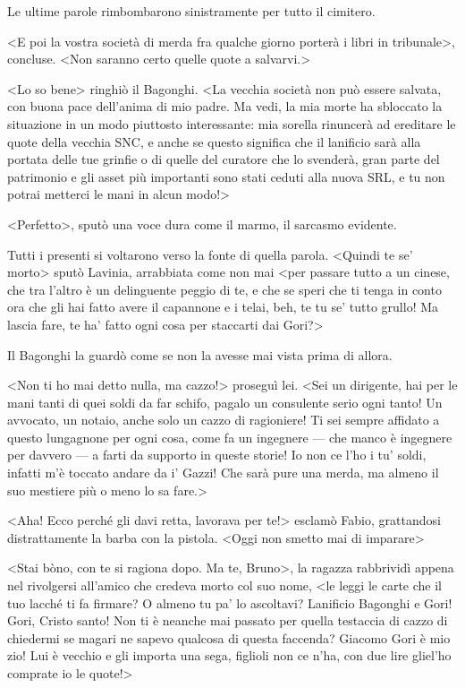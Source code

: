 Le ultime parole rimbombarono sinistramente per tutto il cimitero.

<E poi la vostra società di merda fra qualche giorno porterà i libri in tribunale>, concluse. <Non saranno certo quelle quote a salvarvi.>

<Lo so bene> ringhiò il Bagonghi. <La vecchia società non può essere salvata, con buona pace dell'anima di mio padre. Ma vedi, la mia morte ha sbloccato la situazione in un modo piuttosto interessante: mia sorella rinuncerà ad ereditare le quote della vecchia SNC, e anche se questo significa che il lanificio sarà alla portata delle tue grinfie o di quelle del curatore che lo svenderà, gran parte del patrimonio e gli asset più importanti sono stati ceduti alla nuova SRL, e tu non potrai metterci le mani in alcun modo!>

<Perfetto>, sputò una voce dura come il marmo, il sarcasmo evidente.

Tutti i presenti si voltarono verso la fonte di quella parola. <Quindi te se' morto> sputò Lavinia, arrabbiata come non mai <per passare tutto a un cinese, che tra l'altro è un delinguente peggio di te, e che se speri che ti tenga in conto ora che gli hai fatto avere il capannone e i telai, beh, te tu se' tutto grullo! Ma lascia fare, te ha' fatto ogni cosa per staccarti dai Gori?>

Il Bagonghi la guardò come se non la avesse mai vista prima di allora.

<Non ti ho mai detto nulla, ma cazzo!> proseguì lei. <Sei un dirigente, hai per le mani tanti di quei soldi da far schifo, pagalo un consulente serio ogni tanto! Un avvocato, un notaio, anche solo un cazzo di ragioniere! Ti sei sempre affidato a questo lungagnone per ogni cosa, come fa un ingegnere --- che manco è ingegnere per davvero --- a farti da supporto in queste storie! Io non ce l'ho i tu' soldi, infatti m'è toccato andare da i' Gazzi! Che sarà pure una merda, ma almeno il suo mestiere più o meno lo sa fare.>

<Aha! Ecco perché gli davi retta, lavorava per te!> esclamò Fabio, grattandosi distrattamente la barba con la pistola. <Oggi non smetto mai di imparare>

<Stai bòno, con te si ragiona dopo. Ma te, Bruno>, la ragazza rabbrividì appena nel rivolgersi all'amico che credeva morto  col suo nome, <le leggi le carte che il tuo lacché ti fa firmare? O almeno tu pa' lo ascoltavi? Lanificio Bagonghi e Gori! Gori, Cristo santo! Non ti è neanche mai passato per quella testaccia di cazzo di chiedermi se magari ne sapevo qualcosa di questa faccenda? Giacomo Gori è mio zio! Lui è vecchio e gli importa una sega, figlioli non ce n'ha, con due lire gliel'ho comprate io le quote!>

